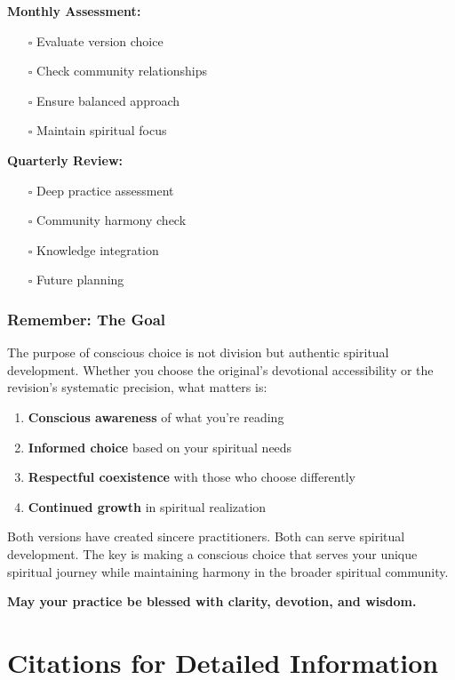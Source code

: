 \documentclass[11pt,twoside]{book}
\begin{document}
\begin{itemize}
\textbf{\textbf{Monthly Assessment:}}
\begin{itemize}
\item[{$\square$}] Evaluate version choice
\item[{$\square$}] Check community relationships
\item[{$\square$}] Ensure balanced approach
\item[{$\square$}] Maintain spiritual focus
\end{itemize}

\textbf{\textbf{Quarterly Review:}}
\begin{itemize}
\item[{$\square$}] Deep practice assessment
\item[{$\square$}] Community harmony check
\item[{$\square$}] Knowledge integration
\item[{$\square$}] Future planning
\end{itemize}
\end{itemize}
\section*{Remember: The Goal}
\label{sec:orgdadd827}

The purpose of conscious choice is not division but authentic spiritual development. Whether you choose the original's devotional accessibility or the revision's systematic precision, what matters is:

\begin{enumerate}
\item \textbf{\textbf{Conscious awareness}} of what you're reading
\item \textbf{\textbf{Informed choice}} based on your spiritual needs
\item \textbf{\textbf{Respectful coexistence}} with those who choose differently
\item \textbf{\textbf{Continued growth}} in spiritual realization
\end{enumerate}

Both versions have created sincere practitioners. Both can serve spiritual development. The key is making a conscious choice that serves your unique spiritual journey while maintaining harmony in the broader spiritual community.

\textbf{May your practice be blessed with clarity, devotion, and wisdom.}
\part*{Citations for Detailed Information}
\label{sec:org9108d92}
\thispagestyle{plain}
\end{document}
